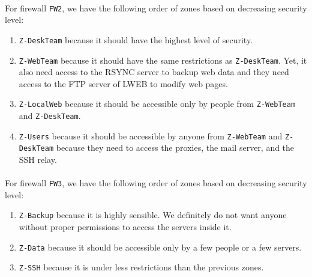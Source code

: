 \documentclass[a4paper, 11pt, oneside]{article}
\begin{document}
\paragraph{}For firewall \texttt{FW2}, we have the following order of zones based on decreasing security level:
\begin{enumerate}[label={\arabic*)}]
\item \texttt{Z-DeskTeam} because it should have the highest level of security.
\item \texttt{Z-WebTeam} because it should have the same restrictions as \texttt{Z-DeskTeam}. Yet, it also need access to the RSYNC server to backup web data and they need access to the FTP server of LWEB to modify web pages.
\item \texttt{Z-LocalWeb} because it should be accessible only by people from \texttt{Z-WebTeam} and \texttt{Z-DeskTeam}.
\item \texttt{Z-Users} because it should be accessible by anyone from \texttt{Z-WebTeam} and \texttt{Z-DeskTeam} because they need to access the proxies, the mail server, and the SSH relay.
\end{enumerate}

\paragraph{}For firewall \texttt{FW3}, we have the following order of zones based on decreasing security level:
\begin{enumerate}[label={\arabic*)}]
\item \texttt{Z-Backup} because it is highly sensible. We definitely do not want anyone without proper permissions to access the servers inside it.
\item \texttt{Z-Data} because it should be accessible only by a few people or a few servers.
\item \texttt{Z-SSH} because it is under less restrictions than the previous zones.
\end{enumerate}

\end{document}
